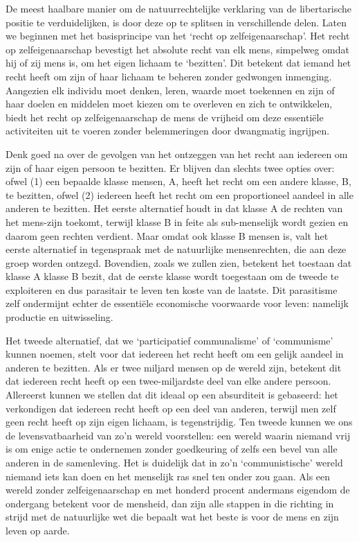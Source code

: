 \documentclass[
  a5paper,
  smalldemyvopaper,10pt,twoside,onecolumn,openright,extrafontsizes,hidelinks]{memoir}
\begin{document}
De meest haalbare manier om de natuurrechtelijke verklaring van de
libertarische positie te verduidelijken, is door deze op te splitsen in
verschillende delen. Laten we beginnen met het basisprincipe van het
`recht op zelfeigenaarschap'. Het recht op zelfeigenaarschap bevestigt
het absolute recht van elk mens, simpelweg omdat hij of zij mens is, om
het eigen lichaam te `bezitten'. Dit betekent dat iemand het recht heeft
om zijn of haar lichaam te beheren zonder gedwongen inmenging. Aangezien
elk individu moet denken, leren, waarde moet toekennen en zijn of haar
doelen en middelen moet kiezen om te overleven en zich te ontwikkelen,
biedt het recht op zelfeigenaarschap de mens de vrijheid om deze
essentiële activiteiten uit te voeren zonder belemmeringen door
dwangmatig ingrijpen.

Denk goed na over de gevolgen van het ontzeggen van het recht aan
iedereen om zijn of haar eigen persoon te bezitten. Er blijven dan
slechts twee opties over: ofwel (1) een bepaalde klasse mensen, A, heeft
het recht om een andere klasse, B, te bezitten, ofwel (2) iedereen heeft
het recht om een proportioneel aandeel in alle anderen te bezitten. Het
eerste alternatief houdt in dat klasse A de rechten van het mens-zijn
toekomt, terwijl klasse B in feite als sub-menselijk wordt gezien en
daarom geen rechten verdient. Maar omdat ook klasse B mensen is, valt
het eerste alternatief in tegenspraak met de natuurlijke mensenrechten,
die aan deze groep worden ontzegd. Bovendien, zoals we zullen zien,
betekent het toestaan dat klasse A klasse B bezit, dat de eerste klasse
wordt toegestaan om de tweede te exploiteren en dus parasitair te leven
ten koste van de laatste. Dit parasitisme zelf ondermijnt echter de
essentiële economische voorwaarde voor leven: namelijk productie en
uitwisseling.

Het tweede alternatief, dat we `participatief communalisme' of
`communisme' kunnen noemen, stelt voor dat iedereen het recht heeft om
een gelijk aandeel in anderen te bezitten. Als er twee miljard mensen op
de wereld zijn, betekent dit dat iedereen recht heeft op een
twee-miljardste deel van elke andere persoon. Allereerst kunnen we
stellen dat dit ideaal op een absurditeit is gebaseerd: het verkondigen
dat iedereen recht heeft op een deel van anderen, terwijl men zelf geen
recht heeft op zijn eigen lichaam, is tegenstrijdig. Ten tweede kunnen
we ons de levensvatbaarheid van zo'n wereld voorstellen: een wereld
waarin niemand vrij is om enige actie te ondernemen zonder goedkeuring
of zelfs een bevel van alle anderen in de samenleving. Het is duidelijk
dat in zo'n `communistische' wereld niemand iets kan doen en het
menselijk ras snel ten onder zou gaan. Als een wereld zonder
zelfeigenaarschap en met honderd procent andermans eigendom de ondergang
betekent voor de mensheid, dan zijn alle stappen in die richting in
strijd met de natuurlijke wet die bepaalt wat het beste is voor de mens
en zijn leven op aarde.
\end{document}
